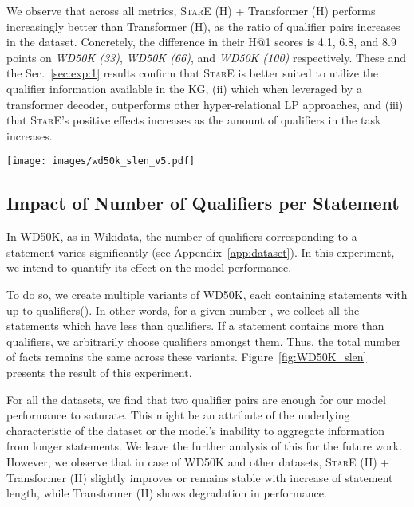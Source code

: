 \documentclass[11pt,a4paper]{article}
\begin{document}
We observe that across all metrics, \textsc{StarE} (H) + Transformer (H) performs increasingly better than Transformer (H), as the ratio of qualifier pairs increases in the dataset.
Concretely, the difference in their H@1 scores is 4.1, 6.8, and 8.9 points on \emph{WD50K (33)}, \emph{WD50K (66)}, and \emph{WD50K (100)} respectively.
These and the Sec.~\ref{sec:exp:1} results confirm that 
\textsc{StarE} is better suited to utilize the qualifier information available in the KG, (ii) which when leveraged by a transformer decoder, outperforms other hyper-relational LP approaches, and (iii) that \textsc{StarE}'s positive effects increases as the amount of qualifiers in the task increases.







\begin{figure*}[t]
    \centering
    \texttt{[image: images/wd50k\_slen\_v5.pdf]}
    \caption{Statement length experiment. \textsc{StarE} (H) + Transformer (H) saturates after two qualifiers with slightly increase, whereas Transformer (H) is unstable in handling qualifiers.}
    \label{fig:WD50K_slen}
\end{figure*}

\subsection{Impact of Number of Qualifiers per Statement}
\label{exp:statement_len}

In WD50K, as in Wikidata, the number of qualifiers corresponding to a statement varies significantly (see Appendix~\ref{app:dataset}).
In this experiment, we intend to quantify its effect on the model performance.

To do so, we create multiple variants of WD50K, each containing statements with up to  qualifiers().
In other words, for a given number , we collect all the statements which have less than  qualifiers. 
If a statement contains more than  qualifiers, we arbitrarily choose  qualifiers amongst them. 
Thus, the total number of facts remains the same across these variants.
Figure~\ref{fig:WD50K_slen} presents the result of this experiment.

For all the datasets, we find that two qualifier pairs are enough for our model performance to saturate. This might be an attribute of the underlying characteristic of the dataset or the model's inability to aggregate information from longer statements. 
We leave the further analysis of this for the future work.
However, we observe that in case of WD50K and other datasets, \textsc{StarE (H)} + Transformer (H) slightly improves or remains stable with increase of statement length, while Transformer (H) shows degradation in performance. 
\end{document}
